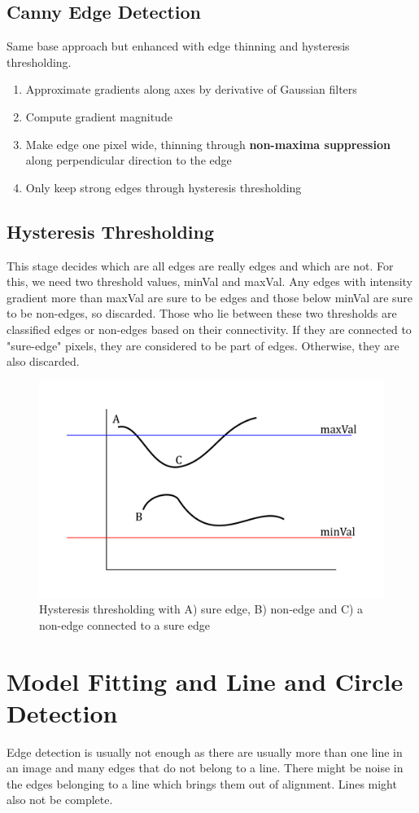 \documentclass[11pt]{article}
\theoremstyle{definition}
\begin{document}
\subsection{Canny Edge Detection}
Same base approach but enhanced with edge thinning and hysteresis thresholding.
\begin{enumerate}
	\item Approximate gradients along axes by derivative of Gaussian filters
	\item Compute gradient magnitude
	\item Make edge one pixel wide, thinning through \textbf{non-maxima suppression} along perpendicular direction to the edge
	\item Only keep strong edges through hysteresis thresholding 
\end{enumerate}

\subsection{Hysteresis Thresholding}
This stage decides which are all edges are really edges and which are not. For this, we need two threshold values, minVal and maxVal. Any edges with intensity gradient more than maxVal are sure to be edges and those below minVal are sure to be non-edges, so discarded. Those who lie between these two thresholds are classified edges or non-edges based on their connectivity. If they are connected to "sure-edge" pixels, they are considered to be part of edges. Otherwise, they are also discarded.
	
\begin{figure}[H]
	\centering
	\includegraphics[keepaspectratio,width=0.6\linewidth]{hysteresis_thresholding}
	\caption{Hysteresis thresholding with A) sure edge, B) non-edge and C) a non-edge connected to a sure edge}
\end{figure}

\section{Model Fitting and Line and Circle Detection}
Edge detection is usually not enough as there are usually more than one line in an image and many edges that do not belong to a line. There might be noise in the edges belonging to a line which brings them out of alignment. Lines might also not be complete.
\end{document}
